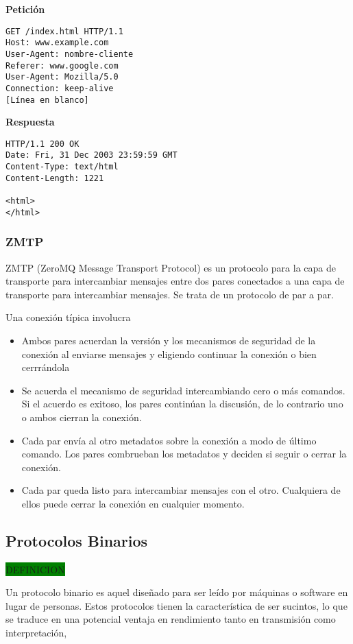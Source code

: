 \textbf{Petición}
\begin{verbatim}
GET /index.html HTTP/1.1
Host: www.example.com
User-Agent: nombre-cliente
Referer: www.google.com
User-Agent: Mozilla/5.0
Connection: keep-alive
[Línea en blanco]
\end{verbatim}

\textbf{Respuesta}
\begin{verbatim}
HTTP/1.1 200 OK
Date: Fri, 31 Dec 2003 23:59:59 GMT
Content-Type: text/html
Content-Length: 1221

<html>
</html>
\end{verbatim}

\subsubsection{ZMTP}
ZMTP (ZeroMQ Message Transport Protocol) es un protocolo para la capa de transporte para intercambiar mensajes entre dos pares conectados a una capa de transporte para intercambiar mensajes. Se trata de un protocolo de par a par.

Una conexión típica involucra
\begin{itemize}
  \item Ambos pares acuerdan la versión y los mecanismos de seguridad de la conexión al enviarse mensajes y eligiendo continuar la conexión o bien cerrrándola
  \item Se acuerda el mecanismo de seguridad intercambiando cero o más comandos. Si el acuerdo es exitoso, los pares continúan la discusión, de lo contrario uno o ambos cierran la conexión.
  \item Cada par envía al otro metadatos sobre la conexión a modo de último comando. Los pares combrueban los metadatos y deciden si seguir o cerrar la conexión.
  \item Cada par queda listo para intercambiar mensajes con el otro. Cualquiera de ellos puede cerrar la conexión en cualquier momento.
\end{itemize}

\subsection{Protocolos Binarios}

\colorbox{green}{DEFINICION}

Un protocolo binario es aquel diseñado para ser leído por máquinas o software en lugar de personas. Estos protocolos tienen la característica de ser sucintos, lo que se traduce en una potencial ventaja en rendimiento tanto en transmisión como interpretación,

